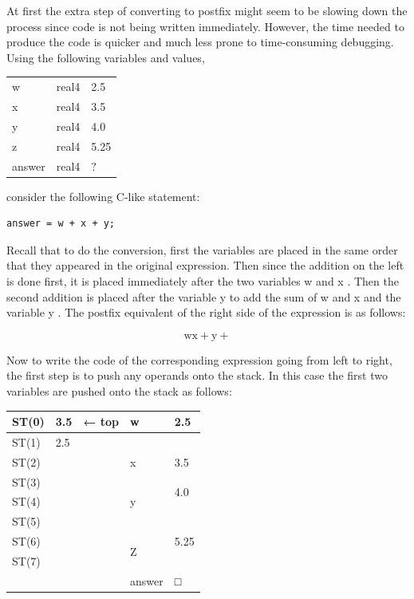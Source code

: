 \documentclass[10pt]{article}
\begin{document}
At first the extra step of converting to postfix might seem to be slowing down the process since code is not being written immediately. However, the time needed to produce the code is quicker and much less prone to time-consuming debugging. Using the following variables and values,

\begin{center}
\begin{tabular}{lll}
w & real4 & 2.5 \\
x & real4 & 3.5 \\
y & real4 & 4.0 \\
z & real4 & 5.25 \\
answer & real4 & $?$ \\
\end{tabular}
\end{center}

consider the following C-like statement:

\begin{verbatim}
answer = w + x + y;
\end{verbatim}

Recall that to do the conversion, first the variables are placed in the same order that they appeared in the original expression. Then since the addition on the left is done first, it is placed immediately after the two variables w and x . Then the second addition is placed after the variable y to add the sum of w and x and the variable y . The postfix equivalent of the right side of the expression is as follows:

$$
\mathrm{w} \mathrm{x}+\mathrm{y}+
$$

Now to write the code of the corresponding expression going from left to right, the first step is to push any operands onto the stack. In this case the first two variables are pushed onto the stack as follows:

\begin{center}
\begin{tabular}{|l|l|l|l|l|}
\hline
ST(0) & 3.5 & ← top & w & 2.5 \\
\hline
ST(1) & 2.5 & \multirow{8}{*}{} &  &  \\
\hline
ST(2) &  &  & x & 3.5 \\
\hline
ST(3) &  &  & \multirow{3}{*}{y} & \multirow{2}{*}{4.0} \\
\hline
ST(4) &  &  &  &  \\
\hline
ST(5) &  &  &  &  \\
\hline
ST(6) &  &  & \multirow[t]{2}{*}{Z} & 5.25 \\
\hline
ST(7) &  &  &  &  \\
\hline
 &  &  & answer & □ \\
\hline
\end{tabular}
\end{center}
\end{document}

